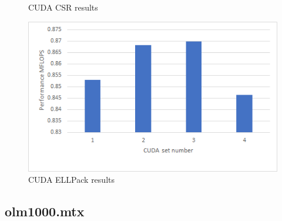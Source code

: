 \documentclass{scrreprt}
\begin{document}
\begin{figure}[ht]
\begin{minipage}[b]{0.5\linewidth}
    \caption{CUDA CSR results} 
    \vspace{4ex}
  \end{minipage}%
  \begin{minipage}[b]{0.5\linewidth}
    \centering
    \includegraphics[width=.9\linewidth]{adderELLCUDA.png} 
    \caption{CUDA ELLPack  results} 
    \vspace{4ex}
  \end{minipage} 
\end{figure}
\FloatBarrier


\subsection{olm1000.mtx}
\end{document}
